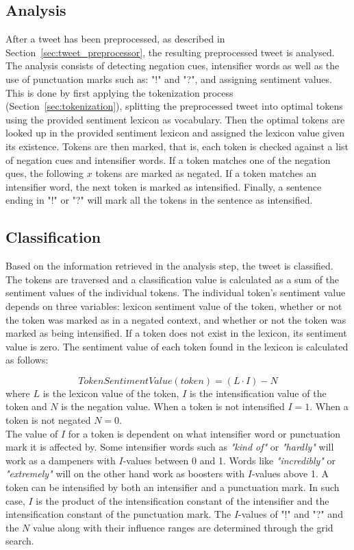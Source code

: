 \subsection*{Analysis}
After a tweet has been preprocessed, as described in Section~\ref{sec:tweet_preprocessor}, the resulting preprocessed tweet is analysed. The analysis consists of detecting negation cues, intensifier words as well as the use of punctuation marks such as: "!" and "?", and assigning sentiment values. This is done by first applying the tokenization process (Section~\ref{sec:tokenization}), splitting the preprocessed tweet into optimal tokens using the provided sentiment lexicon as vocabulary. Then the optimal tokens are looked up in the provided sentiment lexicon and assigned the lexicon value given its existence. Tokens are then marked, that is, each token is checked against a list of negation cues and intensifier words. If a token matches one of the negation ques, the following $x$ tokens are marked as negated. If a token matches an intensifier word, the next token is marked as intensified. Finally, a sentence ending in "!" or "?" will mark all the tokens in the sentence as intensified.


\subsection*{Classification}
Based on the information retrieved in the analysis step, the tweet is classified. The tokens are traversed and a classification value is calculated as a sum of the sentiment values of the individual tokens. The individual token's sentiment value depends on three variables: lexicon sentiment value of the token, whether or not the token was marked as in a negated context, and whether or not the token was marked as being intensified. If a token does not exist in the lexicon, its sentiment value is zero. The sentiment value of each token found in the lexicon is calculated as follows:

\begin{equation}
    Token Sentiment Value(token) = (L \cdot I) - N
    \label{eq:token_sentiment}
\end{equation}
where $L$ is the lexicon value of the token, $I$ is the intensification value of the token and $N$ is the negation value. When a token is not intensified $I=1$. When a token is not negated $N=0$. \\

The value of $I$ for a token is dependent on what intensifier word or punctuation mark it is affected by. Some intensifier words such as \textit{"kind of"} or \textit{"hardly"} will work as a dampeners with $I$-values between 0 and 1. Words like \textit{"incredibly"} or \textit{"extremely"} will on the other hand work as boosters with $I$-values above 1. A token can be intensified by both an intensifier and a punctuation mark. In such case, $I$ is the product of the intensification constant of the intensifier and the intensification constant of the punctuation mark. The $I$-values of "!" and "?" and the $N$ value along with their influence ranges are determined through the grid search. \\


